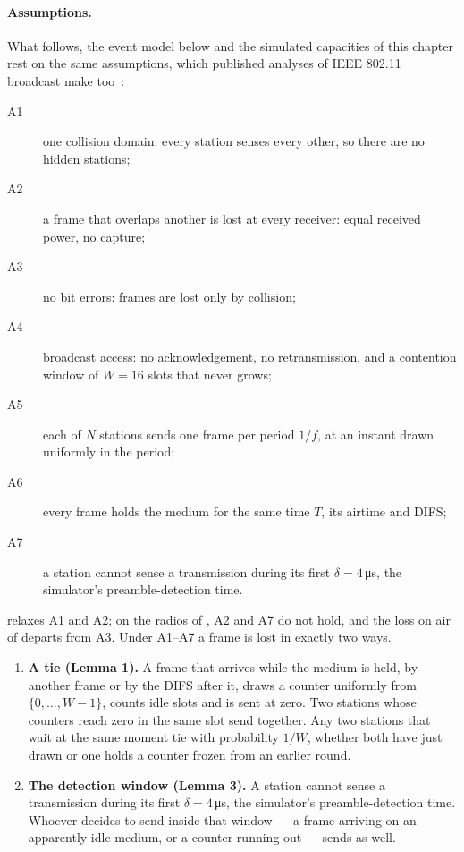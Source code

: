 \paragraph{Assumptions.} What follows, the event model below and the simulated capacities of this
chapter rest on the same assumptions, which published analyses of IEEE 802.11 broadcast make
too~\cite{bazzi2016beaconing,sepulcre2022analytical}:
\begin{description}
\item[A1] one collision domain: every station senses every other, so there are no hidden stations;
\item[A2] a frame that overlaps another is lost at every receiver: equal received power, no
capture;
\item[A3] no bit errors: frames are lost only by collision;
\item[A4] broadcast access: no acknowledgement, no retransmission, and a contention window of
$W = 16$ slots that never grows;
\item[A5] each of $N$ stations sends one frame per period $1/f$, at an instant drawn uniformly in
the period;
\item[A6] every frame holds the medium for the same time $T$, its airtime and DIFS;
\item[A7] a station cannot sense a transmission during its first $\delta = 4$\,\si{\micro\second},
the simulator's preamble-detection time.
\end{description}
 relaxes A1 and A2; on the radios of , A2 and A7 do not hold,
and the loss on air of  departs from A3. Under A1--A7 a frame is lost in
exactly two ways.

\begin{enumerate}
\item \textbf{A tie (Lemma 1).} A frame that arrives while the medium is held, by another frame or by the
DIFS after it, draws a counter uniformly from $\{0,\dots,W-1\}$, counts idle slots and is sent
at zero. Two stations whose counters reach zero in the same slot send together. Any two stations
that wait at the same moment tie with probability $1/W$, whether both have just drawn or one
holds a counter frozen from an earlier round.
\item \textbf{The detection window (Lemma 3).} A station cannot sense a transmission during its first
$\delta = 4$\,\si{\micro\second}, the simulator's preamble-detection time. Whoever decides to
send inside that window --- a frame arriving on an apparently idle medium, or a counter running
out --- sends as well.
\end{enumerate}

